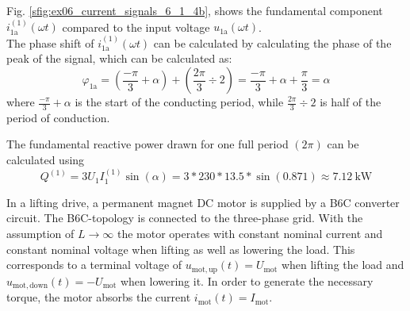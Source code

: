 \begin{solutionblock}
        Fig. \ref{sfig:ex06_current_signals_6_1_4b}, shows the fundamental component $i^\mathrm{(1)}_\mathrm{1a}(\omega t)$ compared to the input voltage $u_\mathrm{1a}(\omega t)$.
        \\
        The phase shift of $i^\mathrm{(1)}_\mathrm{1a}(\omega t)$ can be calculated by calculating the phase of the peak of the signal, which can be calculated as: 
        \begin{equation}
            \varphi_\mathrm{1a} = (\frac{-\pi}{3} + \alpha) + (\frac{2\pi}{3} \div 2) = \frac{-\pi}{3} + \alpha + \frac{\pi}{3} = \alpha   
        \end{equation}
        where $\frac{-\pi}{3} + \alpha$ is the start of the conducting period, while $\frac{2\pi}{3} \div 2$ is half of the period of conduction.
        

    \end{solutionblock}
    \begin{solutionblock}
        The fundamental reactive power drawn for one full period $(2\pi)$ can be calculated using
        \begin{equation}
            Q^\mathrm{(1)} = 3 U_1 I^\mathrm{(1)}_1 \sin(\alpha)  = 3*230*13.5*\sin(0.871) \approx \SI{7.12}{\kilo \watt} 
        \end{equation}
    \end{solutionblock}

In a lifting drive, a permanent magnet DC motor is supplied by a B6C converter circuit. The B6C-topology is connected to the three-phase grid.
With the assumption of $L\rightarrow\infty$ the motor operates with constant nominal current and constant nominal voltage when lifting as well as lowering the load.
This corresponds to a terminal voltage of $u_\mathrm{mot,up}(t)=U_\mathrm{mot}$ when lifting the load and $u_\mathrm{mot,down}(t)=-U_\mathrm{mot}$ when lowering it.
In order to generate the necessary torque, the motor absorbs the current $i_\mathrm{mot}(t)=I_\mathrm{mot}$.



